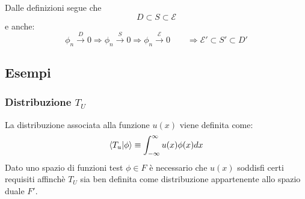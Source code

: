 \documentclass[twoside]{article}
\begin{document}
Dalle definizioni segue che
\begin{equation}
    D\subset S\subset \mathcal{E}
\end{equation}
e anche:
\begin{equation}
    \phi_n\xrightarrow{D}0\Longrightarrow\phi_n\xrightarrow{S}0\Longrightarrow\phi_n\xrightarrow{\mathcal{E}}0 \qquad \Longrightarrow \mathcal{E}'\subset S'\subset D'
\end{equation}
\subsection{Esempi}
\subsubsection{Distribuzione \texorpdfstring{$T_U$}{Lg}}
La distribuzione associata alla funzione $u(x)$ viene definita come:
\begin{equation}
    \bra{T_u}\ket{\phi}\equiv\int_{-\infty}^\infty u(x)\phi(x)dx
\end{equation}
Dato uno spazio di funzioni test $\phi \in F$ è necessario che $u(x)$ soddisfi certi requisiti affinchè $T_U$ sia ben definita come distribuzione appartenente allo spazio duale $F'$.
\end{document}
